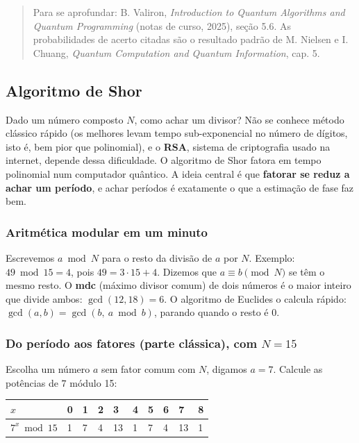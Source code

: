 \begin{quote}
Para se aprofundar: B. Valiron, \emph{Introduction to Quantum Algorithms and Quantum Programming} (notas de curso, 2025), seção 5.6. As probabilidades de acerto citadas são o resultado padrão de M. Nielsen e I. Chuang, \emph{Quantum Computation and Quantum Information}, cap. 5.
\end{quote}

\subsection{Algoritmo de Shor}
Dado um número composto \(N\), como achar um divisor? Não se conhece método clássico rápido (os melhores levam tempo sub-exponencial no número de dígitos, isto é, bem pior que polinomial), e o \textbf{RSA}, sistema de criptografia usado na internet, depende dessa dificuldade. O algoritmo de Shor fatora em tempo polinomial num computador quântico. A ideia central é que \textbf{fatorar se reduz a achar um período}, e achar períodos é exatamente o que a estimação de fase faz bem.

\subsubsection{Aritmética modular em um minuto}\label{aritmuxe9tica-modular-em-um-minuto}

Escrevemos \(a \bmod N\) para o resto da divisão de \(a\) por \(N\). Exemplo: \(49 \bmod 15 = 4\), pois \(49=3\cdot15+4\). Dizemos que \(a\equiv b \pmod N\) se têm o mesmo resto. O \textbf{mdc} (máximo divisor comum) de dois números é o maior inteiro que divide ambos: \(\gcd(12,18)=6\). O algoritmo de Euclides o calcula rápido: \(\gcd(a,b)=\gcd(b,\ a \bmod b)\), parando quando o resto é 0.

\subsubsection{\texorpdfstring{Do período aos fatores (parte clássica), com \(N=15\)}{Do período aos fatores (parte clássica), com N=15}}\label{do-peruxedodo-aos-fatores-parte-cluxe1ssica-com-n15}

Escolha um número \(a\) sem fator comum com \(N\), digamos \(a=7\). Calcule as potências de \(7\) módulo 15:

\begin{center}\begin{tabular}{llllllllll}
\hline
\(x\) & 0 & 1 & 2 & 3 & 4 & 5 & 6 & 7 & 8 \\
\hline

\hline

\(7^x \bmod 15\) & 1 & 7 & 4 & 13 & 1 & 7 & 4 & 13 & 1 \\
\end{tabular}\end{center}

